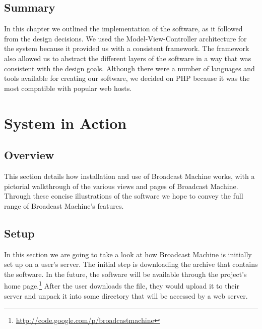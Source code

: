 \documentclass[a4paper,12pt]{report}
\begin{document}
\section{Summary}
In this chapter we outlined the implementation of the software, as it followed from the design decisions. We used the 
Model-View-Controller architecture for the system because it provided us with a consistent framework. The framework also allowed us to 
abstract the different layers of the software in a way that was consistent with the design goals. Although there were a number of 
languages and tools available for creating our software, we decided on PHP because it was the most compatible with popular web hosts.

\chapter{System in Action}
\section{Overview}
This section details how installation and use of Broadcast Machine works, with a pictorial walkthrough of the various views and pages of Broadcast Machine. 
Through these concise illustrations of the software we hope to convey the full range of Broadcast Machine's features.

\section{Setup}
In this section we are going to take a look at how Broadcast Machine is initially set up on a user's server.
The initial step is downloading the archive that contains the software.
In the future, the software will be available through the project's home page.\footnote{\url{http://code.google.com/p/broadcastmachine}}
After the user downloads the file, they would upload it to their server and unpack it into some directory that will be accessed by a web server.
\end{document}
